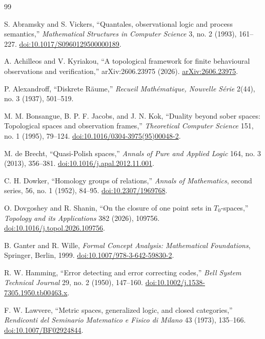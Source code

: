 \documentclass[11pt]{article}
\theoremstyle{definition}
\theoremstyle{plain}
\theoremstyle{remark}
\begin{document}
\begin{thebibliography}{99}
\small

S. Abramsky and S. Vickers,
``Quantales, observational logic and process semantics,''
\emph{Mathematical Structures in Computer Science} 3, no. 2 (1993), 161--227.
\href{https://doi.org/10.1017/S0960129500000189}
{doi:10.1017/S0960129500000189}.

A. Achilleos and V. Kyriakou,
``A topological framework for finite behavioural observations and verification,''
arXiv:2606.23975 (2026).
\href{https://arxiv.org/abs/2606.23975}{arXiv:2606.23975}.

P. Alexandroff,
``Diskrete R\"aume,''
\emph{Recueil Math\'ematique, Nouvelle S\'erie} 2(44), no. 3 (1937),
501--519.

M. M. Bonsangue, B. P. F. Jacobs, and J. N. Kok,
``Duality beyond sober spaces: Topological spaces and observation frames,''
\emph{Theoretical Computer Science} 151, no. 1 (1995), 79--124.
\href{https://doi.org/10.1016/0304-3975(95)00048-2}
{doi:10.1016/0304-3975(95)00048-2}.

M. de Brecht,
``Quasi-Polish spaces,''
\emph{Annals of Pure and Applied Logic} 164, no. 3 (2013), 356--381.
\href{https://doi.org/10.1016/j.apal.2012.11.001}
{doi:10.1016/j.apal.2012.11.001}.

C. H. Dowker,
``Homology groups of relations,''
\emph{Annals of Mathematics}, second series, 56, no. 1 (1952), 84--95.
\href{https://doi.org/10.2307/1969768}{doi:10.2307/1969768}.


O. Dovgoshey and R. Shanin,
``On the closure of one point sets in $T_0$-spaces,''
\emph{Topology and its Applications} 382 (2026), 109756.
\href{https://doi.org/10.1016/j.topol.2026.109756}
{doi:10.1016/j.topol.2026.109756}.

B. Ganter and R. Wille,
\emph{Formal Concept Analysis: Mathematical Foundations},
Springer, Berlin, 1999.
\href{https://doi.org/10.1007/978-3-642-59830-2}
{doi:10.1007/978-3-642-59830-2}.

R. W. Hamming,
``Error detecting and error correcting codes,''
\emph{Bell System Technical Journal} 29, no. 2 (1950), 147--160.
\href{https://doi.org/10.1002/j.1538-7305.1950.tb00463.x}
{doi:10.1002/j.1538-7305.1950.tb00463.x}.

F. W. Lawvere,
``Metric spaces, generalized logic, and closed categories,''
\emph{Rendiconti del Seminario Matematico e Fisico di Milano} 43 (1973),
135--166.
\href{https://doi.org/10.1007/BF02924844}{doi:10.1007/BF02924844}.


\end{thebibliography}
\end{document}
